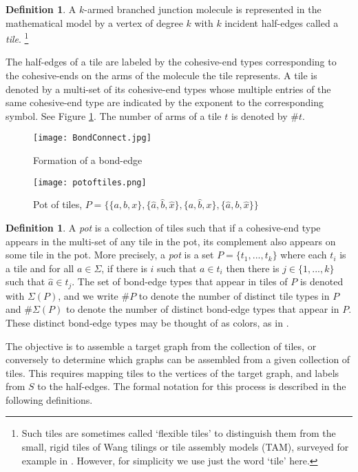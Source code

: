 \documentclass{elsarticle}
\theoremstyle{definition}
\newtheorem{definition}[theorem]{Definition}
\theoremstyle{remark}
\theoremstyle{plain}
\theoremstyle{plain}
\begin{document}
\begin{definition}  A $k$-armed branched junction molecule is represented in the mathematical model by a vertex of degree $k$ with $k$ incident half-edges called a \emph{tile}. \footnote{Such tiles are sometimes called `flexible tiles' to distinguish them from the small, rigid tiles of Wang tilings or tile assembly models (TAM), surveyed for example in \cite{CW2017}.  However, for simplicity we use just the word `tile' here.}

The half-edges of a tile are labeled by the cohesive-end types corresponding to the cohesive-ends on the arms of the molecule the tile represents. A tile is denoted by a multi-set of its cohesive-end types whose multiple entries of the same cohesive-end type are indicated by the exponent to the corresponding symbol. See Figure \ref{potoftiles}. The number of arms of a tile $t$ is denoted by $\#t$.  
\end{definition} 


\begin{figure}\centering \texttt{[image: BondConnect.jpg]}\caption{Formation of a bond-edge} \end{figure}
 
\begin{figure} \centering \texttt{[image: potoftiles.png]}\caption{Pot of tiles, $P = \{ \{a,b,x\}, \{\hat{a}, \hat{b}, \hat{x} \}, \{a, \hat{b}, x \}, \{\hat{a}, b, \hat{x}\}\}$}\label{potoftiles} \end{figure}

\begin{definition} A \emph{pot} is a collection of tiles such that if a cohesive-end type appears in the multi-set of any tile in the pot, its complement also appears on some tile in the pot. More precisely, a \textit{pot} is a set $P = \{t_1,...,t_k\}$ where each $t_i$ is a tile and for all $a\in \Sigma$, if there is $i$ such that $a\in t_i$ then there is $j\in\{1,...,k\}$ such that $\hat{a}\in t_j$. The set of bond-edge types that appear in tiles of $P$ is denoted with $\Sigma(P)$, and we write $\#P$ to denote the number of distinct tile types in $P$ and $\#\Sigma(P)$ to denote the number of distinct bond-edge types that appear in $P$.  These distinct bond-edge types may be thought of as colors, as in \cite{BF2020}. 
\end{definition}

The objective is to assemble a target graph from the collection of tiles, or conversely to determine which graphs can be assembled from a given collection of tiles.  This requires mapping tiles to the vertices of the target graph, and labels from $S$ to the half-edges. The formal notation for this process is described in the following definitions.
\end{document}
